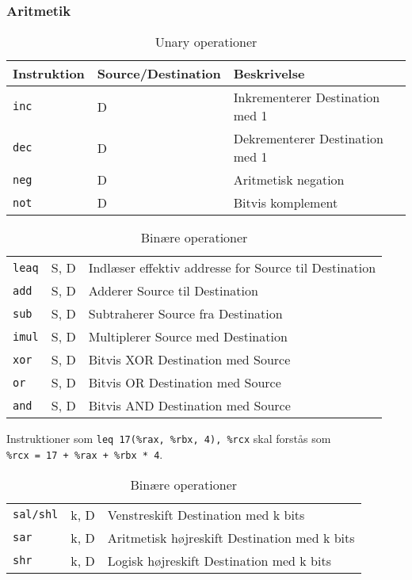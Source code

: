 \subsubsection{Aritmetik}
\begin{table}[h]
    \centering
    \begin{tabular}{ll|l}
        Instruktion&Source/Destination&Beskrivelse\\\hline
        \verb|inc|&D&Inkrementerer Destination med 1\\
        \verb|dec|&D&Dekrementerer Destination med 1\\
        \verb|neg|&D&Aritmetisk negation\\
        \verb|not|&D&Bitvis komplement
    \end{tabular}
    \caption{Unary operationer}
\end{table}
\begin{table}[h]
    \centering
    \begin{tabular}{ll|l}
        \verb|leaq|&S, D&Indlæser effektiv addresse for Source til Destination\\
        \verb|add|&S, D&Adderer Source til Destination\\
        \verb|sub|&S, D&Subtraherer Source fra Destination\\
        \verb|imul|&S, D&Multiplerer Source med Destination\\
        \verb|xor|&S, D&Bitvis XOR Destination med Source\\
        \verb|or|&S, D&Bitvis OR Destination med Source\\
        \verb|and|&S, D&Bitvis AND Destination med Source
    \end{tabular}
    \caption{Binære operationer}
\end{table}
Instruktioner som \verb|leq 17(%rax, %rbx, 4), %rcx| skal forstås som \\\verb|%rcx = 17 + %rax + %rbx * 4|.
\begin{table}[h]
    \centering
    \begin{tabular}{ll|l}
        \verb|sal/shl|&k, D&Venstreskift Destination med k bits\\
        \verb|sar|&k, D&Aritmetisk højreskift Destination med k bits\\
        \verb|shr|&k, D&Logisk højreskift Destination med k bits
    \end{tabular}
    \caption{Binære operationer}
\end{table}
